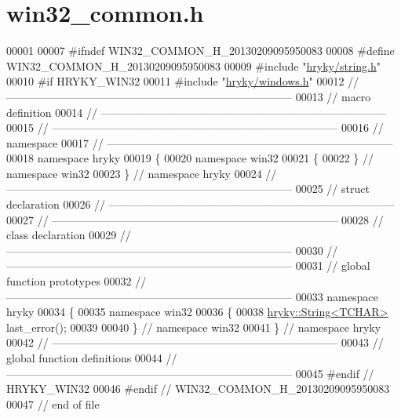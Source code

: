 \hypertarget{win32__common_8h_source}{\section{win32\-\_\-common.\-h}
}

\begin{DoxyCode}
00001 
00007 \textcolor{preprocessor}{#ifndef WIN32\_COMMON\_H\_20130209095950083}
00008 \textcolor{preprocessor}{}\textcolor{preprocessor}{#define WIN32\_COMMON\_H\_20130209095950083}
00009 \textcolor{preprocessor}{}\textcolor{preprocessor}{#include "\hyperlink{string_8h}{hryky/string.h}"}
00010 \textcolor{preprocessor}{#if HRYKY\_WIN32}
00011 \textcolor{preprocessor}{}\textcolor{preprocessor}{#include "\hyperlink{windows_8h}{hryky/windows.h}"}
00012 \textcolor{comment}{//
      ------------------------------------------------------------------------------}
00013 \textcolor{comment}{// macro definition}
00014 \textcolor{comment}{//
      ------------------------------------------------------------------------------}
00015 \textcolor{comment}{//
      ------------------------------------------------------------------------------}
00016 \textcolor{comment}{// namespace}
00017 \textcolor{comment}{//
      ------------------------------------------------------------------------------}
00018 \textcolor{keyword}{namespace }hryky
00019 \{
00020 \textcolor{keyword}{namespace }win32
00021 \{
00022 \} \textcolor{comment}{// namespace win32}
00023 \} \textcolor{comment}{// namespace hryky}
00024 \textcolor{comment}{//
      ------------------------------------------------------------------------------}
00025 \textcolor{comment}{// struct declaration}
00026 \textcolor{comment}{//
      ------------------------------------------------------------------------------}
00027 \textcolor{comment}{//
      ------------------------------------------------------------------------------}
00028 \textcolor{comment}{// class declaration}
00029 \textcolor{comment}{//
      ------------------------------------------------------------------------------}
00030 \textcolor{comment}{//
      ------------------------------------------------------------------------------}
00031 \textcolor{comment}{// global function prototypes}
00032 \textcolor{comment}{//
      ------------------------------------------------------------------------------}
00033 \textcolor{keyword}{namespace }hryky
00034 \{
00035 \textcolor{keyword}{namespace }win32
00036 \{
00038     \hyperlink{classhryky_1_1_string}{hryky::String<TCHAR>} last\_error();
00039 
00040 \} \textcolor{comment}{// namespace win32}
00041 \} \textcolor{comment}{// namespace hryky}
00042 \textcolor{comment}{//
      ------------------------------------------------------------------------------}
00043 \textcolor{comment}{// global function definitions}
00044 \textcolor{comment}{//
      ------------------------------------------------------------------------------}
00045 \textcolor{preprocessor}{#endif // HRYKY\_WIN32}
00046 \textcolor{preprocessor}{}\textcolor{preprocessor}{#endif // WIN32\_COMMON\_H\_20130209095950083}
00047 \textcolor{preprocessor}{}\textcolor{comment}{// end of file}
\end{DoxyCode}
